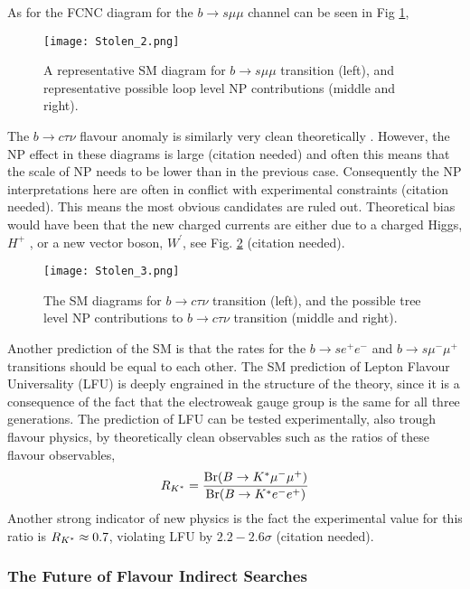 As for the FCNC diagram for the $b \rightarrow s \mu \mu$ channel can be seen in Fig \ref{fig:Flavour_D_2_Muon}, 
%
\begin{figure}[H]
	\centering
	\texttt{[image: Stolen\_2.png]}
	\caption{A representative SM diagram for $b \rightarrow s \mu \mu$ transition (left), and representative possible loop level NP
contributions (middle and right).}
	\label{fig:Flavour_D_2_Muon}
\end{figure}
%
The $b \rightarrow c \tau \nu$ flavour anomaly is similarly very clean theoretically \cite{Fajfer_2012}. However, the NP effect in these diagrams is large {\color{blue} (citation needed)} and often this means that the scale of NP needs to be lower than in the previous case. Consequently the NP interpretations here are often in conflict with experimental constraints {\color{blue} (citation needed)}.
%
This means the most obvious candidates are ruled out. Theoretical bias would have been that the new charged currents are either due to a charged Higgs, $H^+$ , or a new vector boson, $W^\prime$, see Fig. \ref{fig:Flavour_D_3_Tau} {\color{blue} (citation needed)}.
%
\begin{figure}[H]	
	\centering
	\texttt{[image: Stolen\_3.png]}
	\caption{The SM diagrams for $b \rightarrow c \tau \nu$ transition (left), and the possible tree level NP contributions to $b \rightarrow c \tau \nu$ transition (middle and right).}
	\label{fig:Flavour_D_3_Tau}
\end{figure}
%
Another prediction of the SM is that the rates for the  $b \rightarrow s e^+ e^-$ and  $b \rightarrow s \mu^- \mu^+$ transitions should be equal to each other.
%
The SM prediction of Lepton Flavour Universality (LFU) is deeply engrained in the structure of the theory, since it is a consequence of the fact that the electroweak gauge group is the same for all three generations. 
%
The prediction of LFU can be tested experimentally, also trough flavour physics, by theoretically clean observables such as the ratios of these flavour observables, 
%
\begin{equation}
R_{K^{\**}} = \frac{\text{Br}( B \rightarrow K^{\**} \mu^- \mu^+ )}{\text{Br} (  B \rightarrow K^{\**} e^- e^+  )}
\end{equation}
% 
Another strong indicator of new physics is the fact the experimental value for this ratio is $R_{K^{\**}} \approx 0.7$, violating LFU by $2.2 - 2.6 \sigma$ {\color{blue} (citation needed)}.

\subsubsection{The Future of Flavour Indirect Searches}

